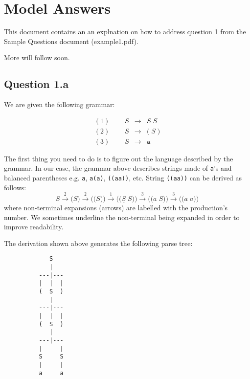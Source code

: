 \documentclass[11pt]{article}
\newcommand{\rul}{\rightarrow}
\newcommand{\rulnum}[1]{\stackrel{#1}{\rightarrow}}
\newcommand{\syntax}[1]{\texttt{#1}}
\begin{document}
\section*{Model Answers}

This document contains an an explnation on how to address question 1 from the Sample Questions document (example1.pdf).

More will follow soon.

\subsection*{Question 1.a}

We are given the following grammar:

$$
\begin{array}{llcl}
(1)\;\;\;\;\; & S & \rul & S \; S \\
(2) & S & \rul & \syntax{(} \;S\; \syntax{)}  \\
(3) & S & \rul & \syntax{a}
\end{array}
$$

The first thing you need to do is to figure out the language described by the grammar. In our case, the grammar above describes strings made of \syntax{a}'s and balanced parentheses e.g. \syntax{a}, \syntax{a(a)}, \syntax{((aa))}, etc. String \syntax{((aa))} can be derived as follows:
$$
S \rulnum{2} \syntax{(} S \syntax{)} \rulnum{2} \syntax{((} S \syntax{))} \rulnum{1}  \syntax{((} \underline{S}\;S \syntax{))}
\rulnum{3} \syntax{((} a\;S \syntax{))} \rulnum{3} \syntax{((} a\;a \syntax{))}
$$
where non-terminal expansions (arrows) are labelled with the production's number. We sometimes underline the non-terminal being expanded in order to improve readability.

The derivation shown above generates the following parse tree:
\begin{verbatim}
             S
             |
          ---|---
          |  |  |
          (  S  )
             |
          ---|---
          |  |  |
          (  S  )
             |
          ---|--- 
          |     | 
          S     S
          |     | 
          a     a
\end{verbatim}
\end{document}
